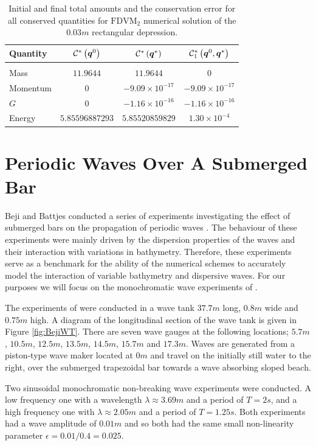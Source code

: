 %
\begin{table}
	\centering
	\begin{tabular}{l  c  c c}
		Quantity& $\mathcal{C}^*\left(\boldsymbol{q}^0\right)$ & $\mathcal{C}^*\left(\boldsymbol{q}^*\right)$ & $\mathcal{C}^*_1\left(\boldsymbol{q}^0,\boldsymbol{q}^*\right)$ \\
		\hline &&& \\
		Mass & $11.9644$ & $11.9644$ & $0$\\
		Momentum & $0$ & $-9.09 \times 10^{-17}$ & $-9.09 \times 10^{-17}$\\
		$G$ & $0$ & $-1.16\times 10^{-16}$ & $-1.16\times 10^{-16}$\\
		Energy & $5.85596887293$ & $5.85520859829 $ & $1.30 \times 10^{-4}$ \\
	\end{tabular}
	\caption{Initial and final total amounts and the conservation error for all conserved quantities for $\text{FDVM}_2$ numerical solution of the $0.03m$ rectangular depression.}
	\label{tab:ConservationSegurFDVM3cm}
\end{table}  
%
\section{Periodic Waves Over A Submerged Bar}
\label{sec:PeriodicWavessubBar}
Beji and Battjes conducted a series of experiments investigating the effect of submerged bars on the propagation of periodic waves \cite{Beji-Battjes-1993-151,Beji-Battjes-1994-1}. The behaviour of these experiments were mainly driven by the dispersion properties of the waves and their interaction with variations in bathymetry. Therefore, these experiments serve as a benchmark for the ability of the numerical schemes to accurately model the interaction of variable bathymetry and dispersive waves. For our purposes we will focus on the monochromatic wave experiments of \citet{Beji-Battjes-1994-1}.

The experiments of \citet{Beji-Battjes-1994-1} were conducted in a wave tank $37.7m$ long, $0.8m$ wide and $0.75m$ high. A diagram of the longitudinal section of the wave tank is given in Figure \ref{fig:BejiWT}. There are seven wave gauges at the following locations; $5.7m$, $10.5m$, $12.5m$, $13.5m$, $14.5m$, $15.7m$ and $17.3m$. Waves are generated from a piston-type wave maker located at $0m$ and travel on the initially still water to the right, over the submerged trapezoidal bar towards a wave absorbing sloped beach.

Two sinusoidal monochromatic non-breaking wave experiments were conducted. A low frequency one with a wavelength $\lambda \approx 3.69m$ and a period of $T = 2s$, and a high frequency one with $\lambda \approx 2.05m$ and a period of $T = 1.25s$. Both experiments had a wave amplitude of $0.01m$ and so both had the same small non-linearity parameter $\epsilon = 0.01 / 0.4 = 0.025$. 

